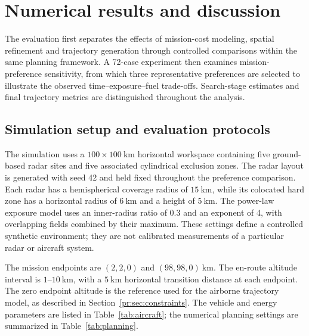 \section{Numerical results and discussion}
\label{sec:results}

The evaluation first separates the effects of mission-cost modeling,
spatial refinement and trajectory generation through controlled comparisons
within the same planning framework. A 72-case experiment then examines
mission-preference sensitivity, from which three representative preferences
are selected to illustrate the observed time--exposure--fuel trade-offs.
Search-stage estimates and final trajectory metrics are distinguished
throughout the analysis.


\subsection{Simulation setup and evaluation protocols}
\label{sec:setup}

The simulation uses a $100\times100~\mathrm{km}$ horizontal workspace
containing five ground-based radar sites and five associated cylindrical
exclusion zones. The radar layout is generated with seed 42 and held fixed
throughout the preference comparison. Each radar has a hemispherical
coverage radius of $15~\mathrm{km}$, while its colocated hard zone has a
horizontal radius of $6~\mathrm{km}$ and a height of $5~\mathrm{km}$.
The power-law exposure model uses an inner-radius ratio of 0.3 and an
exponent of 4, with overlapping fields combined by their maximum.
These settings define a controlled synthetic environment; they are not
calibrated measurements of a particular radar or aircraft system.

The mission endpoints are $(2,2,0)$ and $(98,98,0)~\mathrm{km}$.
The en-route altitude interval is $1$--$10~\mathrm{km}$, with a
$5~\mathrm{km}$ horizontal transition distance at each endpoint.
The zero endpoint altitude is the reference used for the airborne
trajectory model, as described in Section~\ref{pr:sec:constraints}.
The vehicle and energy parameters are listed in Table~\ref{tab:aircraft};
the numerical planning settings are summarized in
Table~\ref{tab:planning}.

